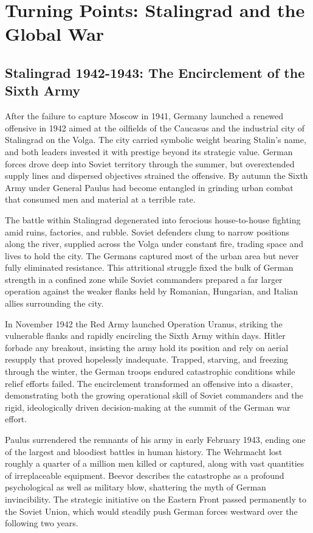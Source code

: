 \section{Turning Points: Stalingrad and the Global War}

\subsection{Stalingrad 1942-1943: The Encirclement of the Sixth Army}
After the failure to capture Moscow in 1941, Germany launched a renewed offensive in 1942 aimed at the oilfields of the Caucasus and the industrial city of Stalingrad on the Volga. The city carried symbolic weight bearing Stalin's name, and both leaders invested it with prestige beyond its strategic value. German forces drove deep into Soviet territory through the summer, but overextended supply lines and dispersed objectives strained the offensive. By autumn the Sixth Army under General Paulus had become entangled in grinding urban combat that consumed men and material at a terrible rate.

The battle within Stalingrad degenerated into ferocious house-to-house fighting amid ruins, factories, and rubble. Soviet defenders clung to narrow positions along the river, supplied across the Volga under constant fire, trading space and lives to hold the city. The Germans captured most of the urban area but never fully eliminated resistance. This attritional struggle fixed the bulk of German strength in a confined zone while Soviet commanders prepared a far larger operation against the weaker flanks held by Romanian, Hungarian, and Italian allies surrounding the city.

In November 1942 the Red Army launched Operation Uranus, striking the vulnerable flanks and rapidly encircling the Sixth Army within days. Hitler forbade any breakout, insisting the army hold its position and rely on aerial resupply that proved hopelessly inadequate. Trapped, starving, and freezing through the winter, the German troops endured catastrophic conditions while relief efforts failed. The encirclement transformed an offensive into a disaster, demonstrating both the growing operational skill of Soviet commanders and the rigid, ideologically driven decision-making at the summit of the German war effort.

Paulus surrendered the remnants of his army in early February 1943, ending one of the largest and bloodiest battles in human history. The Wehrmacht lost roughly a quarter of a million men killed or captured, along with vast quantities of irreplaceable equipment. Beevor describes the catastrophe as a profound psychological as well as military blow, shattering the myth of German invincibility. The strategic initiative on the Eastern Front passed permanently to the Soviet Union, which would steadily push German forces westward over the following two years.

